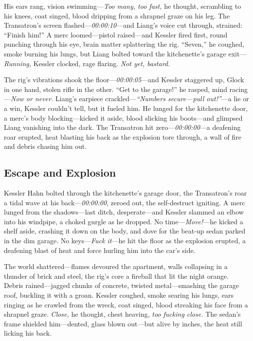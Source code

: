 \documentclass[12pt]{book}
\begin{document}
His ears rang, vision swimming—\textit{Too many, too fast,} he thought, scrambling to his knees, coat singed, blood dripping from a shrapnel graze on his leg. The Transatron’s screen flashed—\textit{00:00:10}—and Liang’s voice cut through, strained: “Finish him!” A merc loomed—pistol raised—and Kessler fired first, round punching through his eye, brain matter splattering the rig. “Seven,” he coughed, smoke burning his lungs, but Liang bolted toward the kitchenette’s garage exit—\textit{Running,} Kessler clocked, rage flaring. \textit{Not yet, bastard.}

The rig’s vibrations shook the floor—\textit{00:00:05}—and Kessler staggered up, Glock in one hand, stolen rifle in the other. “Get to the garage!” he rasped, mind racing—\textit{Now or never.} Liang’s earpiece crackled—\textit{“Numbers secure—pull out!”}—a lie or a win, Kessler couldn’t tell, but it fueled him. He lunged for the kitchenette door, a merc’s body blocking—kicked it aside, blood slicking his boots—and glimpsed Liang vanishing into the dark. The Transatron hit zero—\textit{00:00:00}—a deafening roar erupted, heat blasting his back as the explosion tore through, a wall of fire and debris chasing him out.

\subsection{Escape and Explosion}

Kessler Hahn bolted through the kitchenette’s garage door, the Transatron’s roar a tidal wave at his back—\textit{00:00:00}, zeroed out, the self-destruct igniting. A merc lunged from the shadows—last ditch, desperate—and Kessler slammed an elbow into his windpipe, a choked gurgle as he dropped. No time—\textit{Move!}—he kicked a shelf aside, crashing it down on the body, and dove for the beat-up sedan parked in the dim garage. No keys—\textit{Fuck it}—he hit the floor as the explosion erupted, a deafening blast of heat and force hurling him into the car’s side.

The world shattered—flames devoured the apartment, walls collapsing in a thunder of brick and steel, the rig’s core a fireball that lit the night orange. Debris rained—jagged chunks of concrete, twisted metal—smashing the garage roof, buckling it with a groan. Kessler coughed, smoke searing his lungs, ears ringing as he crawled from the wreck, coat singed, blood streaking his face from a shrapnel graze. \textit{Close,} he thought, chest heaving, \textit{too fucking close.} The sedan’s frame shielded him—dented, glass blown out—but alive by inches, the heat still licking his back.
\end{document}
